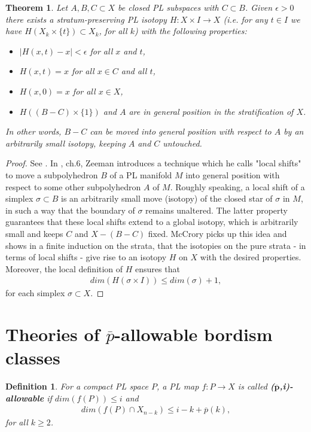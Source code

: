 \documentclass{scrreprt}
\newtheorem{theorem}[prop]{Theorem}
\newtheorem{definition}[prop]{Definition}
\begin{document}
\begin{theorem}\label{mccroryisotopy}
Let $A,B,C \subset X$ be closed PL subspaces with $C \subset B$. Given $\epsilon > 0$ there exists a stratum-preserving PL isotopy $H: X \times I \to X$ (i.e. for any $t \in I$ we have $H(X_k \times \{ t \} ) \subset X_k$, for all $k$) with the following properties:
\begin{itemize}
\item[1.] $|H(x,t)-x| < \epsilon$ for all $x$ and $t$,
\item[2.] $H(x,t)=x$ for all $x \in C$ and all $t$,
\item[3.] $H(x,0)=x$ for all $x \in X$,
\item[4.] $H((B-C) \times \{ 1 \})$ and $A$ are in general position in the stratification of $X$.
\end{itemize}
In other words, $B-C$ can be moved into general position with respect to $A$ by an arbitrarily small isotopy, keeping $A$ and $C$ untouched.
\end{theorem}

\begin{proof}
See \cite{mccrory}. In \cite{zeeman}, ch.6, Zeeman introduces a technique which he calls "local shifts" to move a subpolyhedron $B$ of a PL manifold $M$ into general position with respect to some other subpolyhedron $A$ of $M$. Roughly speaking, a local shift of a simplex $\sigma \subset B$ is an arbitrarily small move (isotopy) of the closed star of $\sigma$ in $M$, in such a way that the boundary of $\sigma$ remains unaltered. The latter property guarantees that these local shifts extend to a global isotopy, which is arbitrarily small and keeps $C$ and $X-(B-C)$ fixed. McCrory picks up this idea and shows in a finite induction on the strata, that the isotopies on the pure strata - in terms of local shifts - give rise to an isotopy $H$ on $X$ with the desired properties. Moreover, the local definition of $H$ ensures that 
\begin{align*}
dim(H(\sigma \times I)) \leq dim(\sigma)+1,
\end{align*}
for each simplex $\sigma \subset X$.
\end{proof}

\section{Theories of $\overline{p}$-allowable bordism classes}
 
\begin{definition}
For a compact PL space $P$, a PL map $f: P \to X$ is called \textbf{($\boldsymbol{\overline{p}}$,i)-allowable} if $dim(f(P)) \leq i$ and 
\begin{align*}
dim(f(P) \cap X_{n-k}) \leq i-k+ \overline{p}(k),
\end{align*}
for all $k \geq 2$.
\end{definition}
\end{document}
